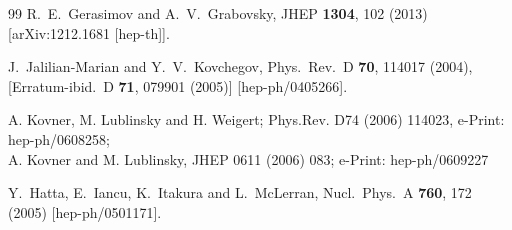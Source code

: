 \documentclass[11pt,a4paper]{article}
\begin{document}
\begin{thebibliography}{99}
  R.~E.~Gerasimov and A.~V.~Grabovsky,
  JHEP {\bf 1304}, 102 (2013)
  [arXiv:1212.1681 [hep-th]].
  








  J.~Jalilian-Marian and Y.~V.~Kovchegov,
  Phys.\ Rev.\ D {\bf 70}, 114017 (2004), 
  [Erratum-ibid.\ D {\bf 71}, 079901 (2005)]
  [hep-ph/0405266].


 A. Kovner, M. Lublinsky and  H. Weigert; Phys.Rev. D74 (2006) 114023, e-Print: hep-ph/0608258; \\
A. Kovner and M. Lublinsky, JHEP 0611 (2006) 083; e-Print: hep-ph/0609227
  

  Y.~Hatta, E.~Iancu, K.~Itakura and L.~McLerran,
  Nucl.\ Phys.\ A {\bf 760}, 172 (2005)
  [hep-ph/0501171].




  
  

\end{thebibliography}
\end{document}
